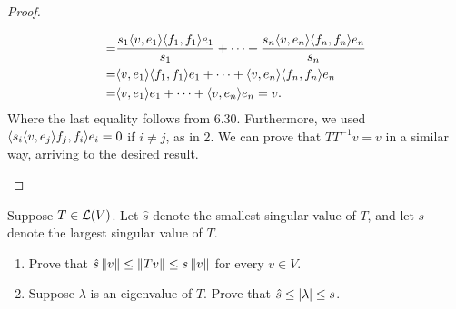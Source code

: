 \begin{proof}
\begin{enumerate}
\begin{align*}
         =& \frac{s_1\langle v,e_1\rangle\langle f_1, f_1\rangle e_1}{s_1}+\dots+\frac{s_n\langle v,e_n\rangle\langle f_n,f_n\rangle e_n}{s_n}\\
         =& \langle v,e_1\rangle\langle f_1, f_1\rangle e_1+\dots+\langle v,e_n\rangle\langle f_n,f_n\rangle e_n\\
         =& \langle v,e_1\rangle e_1+\dots+\langle v,e_n\rangle e_n =v.
     \end{align*}
     Where the last equality follows from 6.30. Furthermore, we used $\langle s_i\langle v,e_j\rangle f_j,f_i\rangle e_i =0$ if $i\neq j$, as in 2. We can prove that $TT^{-1}v=v$ in a similar way, arriving to the desired result.
 \end{enumerate}
\end{proof}

\begin{exercise}{18}
  Suppose $T\in\mathcal{L}(V)$. Let $\hat{s}$ denote the smallest singular value of $T$, and let $s$ denote the largest singular value of $T$.
  \begin{enumerate}
      \item Prove that $\hat{s}\left\lVert v\right\rVert \leq\left\lVert Tv\right\rVert \leq s\left\lVert v\right\rVert$ for every $v\in V$.
      \item Suppose $\lambda$ is an eigenvalue of $T$. Prove that $\hat{s} \leq\left\lvert \lambda\right\rvert \leq s$.
  \end{enumerate}
\end{exercise}
